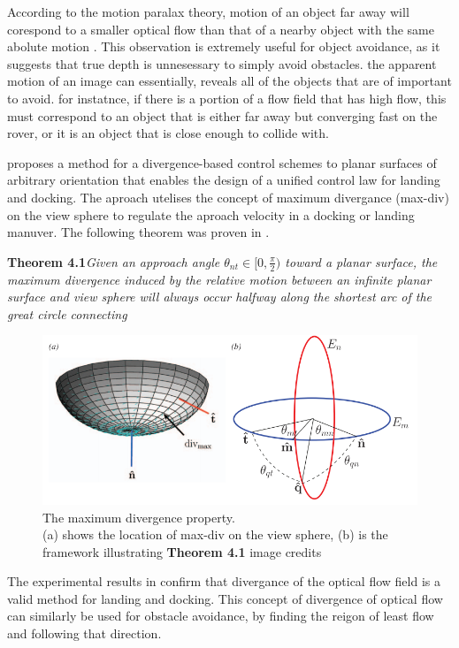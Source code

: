 \documentclass{UoNMCHA}
\numberwithin{equation}{section}
\begin{document}
According to the motion paralax theory, motion of an object far away will corespond to a smaller optical flow than that of a nearby object with the same abolute motion \citep{wang2015obstacle}. This observation is extremely useful for object avoidance, as it suggests that true depth is unnesessary to simply avoid obstacles. the apparent motion of an image can essentially, reveals all of the objects that are of important to avoid. for instatnce, if there is a portion of a flow field that has high flow, this must correspond to an object that is either far away but converging fast on the rover, or it is an object that is close enough to collide with.

\cite{mccarthy2012unified} proposes a method for a divergence-based control schemes to planar surfaces of
arbitrary orientation that enables the design of a unified control law for landing and docking. The aproach utelises the concept of maximum divergance (max-div) on the view sphere to regulate the aproach velocity in a docking or landing manuver. The following theorem was proven in \cite{mccarthy2012unified}.

\textbf{Theorem 4.1}\textit{Given an approach angle $\theta_{nt} \in [0, \frac{\pi}{2})$ toward a planar surface, the maximum divergence induced by the relative motion between an infinite planar surface and view sphere will always occur halfway along the shortest arc of the great circle connecting} \cite{mccarthy2012unified}

\begin{figure}[ht]
    \begin{center}
        \includegraphics[width=.6\linewidth]{Figures/max-div}
        \caption{The maximum divergence property.\\(a) shows the location of max-div on the view sphere, (b) is the framework illustrating \textbf{Theorem 4.1} image credits \cite{mccarthy2012unified}}
        \label{fig:ReferenceFrame}
    \end{center}
\end{figure}

The experimental results in \cite{mccarthy2012unified} confirm that divergance of the optical flow field is a valid method for landing and docking. This concept of divergence of optical flow can similarly be used for obstacle avoidance, by finding the reigon of least flow and following that direction.
\end{document}
